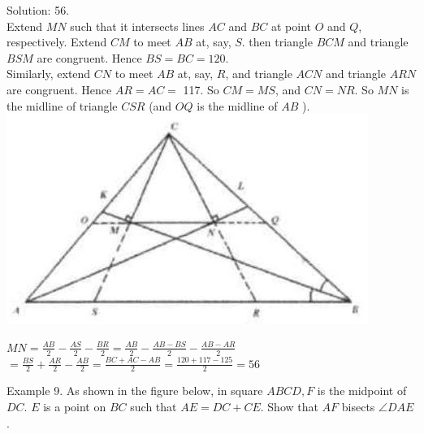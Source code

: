 \documentclass[10pt]{article}
\begin{document}
Solution: 56.\\
Extend \(M N\) such that it intersects lines \(A C\) and \(B C\) at point \(O\) and \(Q\), respectively. Extend \(C M\) to meet \(A B\) at, say, \(S\). then triangle \(B C M\) and triangle \(B S M\) are congruent. Hence \(B S=B C=120\).\\
Similarly, extend \(C N\) to meet \(A B\) at, say, \(R\), and triangle \(A C N\) and triangle \(A R N\) are congruent. Hence \(A R=A C=\) 117. So \(C M=M S\), and \(C N=N R\). So \(M N\) is the midline of triangle \(C S R\) (and \(O Q\) is the midline of \(A B\) ).\\
\includegraphics[max width=\textwidth, center]{2025_04_17_97bc1f7e44d93c271a88g-059}

\(M N=\frac{A B}{2}-\frac{A S}{2}-\frac{B R}{2}=\frac{A B}{2}-\frac{A B-B S}{2}-\frac{A B-A R}{2}\)\\
\(=\frac{B S}{2}+\frac{A R}{2}-\frac{A B}{2}=\frac{B C+A C-A B}{2}=\frac{120+117-125}{2}=56\)

Example 9. As shown in the figure below, in square \(A B C D, F\) is the midpoint of \(D C\). \(E\) is a point on \(B C\) such that \(A E=D C+C E\). Show that \(A F\) bisects \(\angle D A E\).
\end{document}
